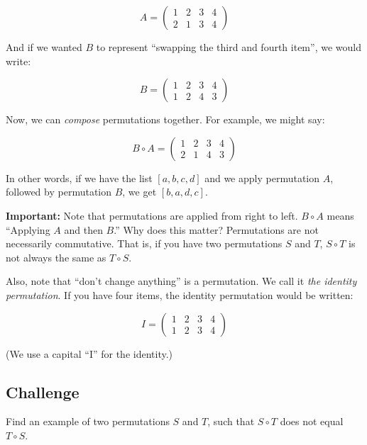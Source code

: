 $$A = \begin{pmatrix}
  1 & 2 & 3 & 4 \\
  2 & 1 & 3 & 4
\end{pmatrix}$$

And if we wanted $B$ to represent ``swapping the third and fourth item'', we would write:

$$B = \begin{pmatrix}                                                                                                                             
  1 & 2 & 3 & 4 \\                                                                                                                                
  1 & 2 & 4 & 3
\end{pmatrix}$$

Now, we can \textit{compose} permutations together. For example, we might say:

$$B \circ A = \begin{pmatrix}
  1 & 2 & 3 & 4 \\
  2 & 1 & 4 & 3
\end{pmatrix}$$

In other words, if we have the list $[a, b, c, d]$ and we apply permutation $A$, followed by permutation $B$, we get $[b, a, d, c]$.

\textbf{Important:} Note that permutations are applied from right to
left. $B \circ A$ means ``Applying $A$ and then $B$.''  Why does this matter?
Permutations are not necessarily commutative. That is, if you have two
permutations $S$ and $T$, $S \circ T$ is not always the same as $T
\circ S$.

Also, note that ``don't change anything'' is a permutation. We call it
\textit{the identity permutation}. If you have four items, the identity
permutation would be written:

$$I = \begin{pmatrix}
  1 & 2 & 3 & 4 \\
  1 & 2 & 3 & 4
\end{pmatrix}$$

(We use a capital ``I'' for the identity.)

\subsection{Challenge} Find an example of two permutations $S$ and $T$, such that $S \circ T$ does not equal $T \circ S$.

